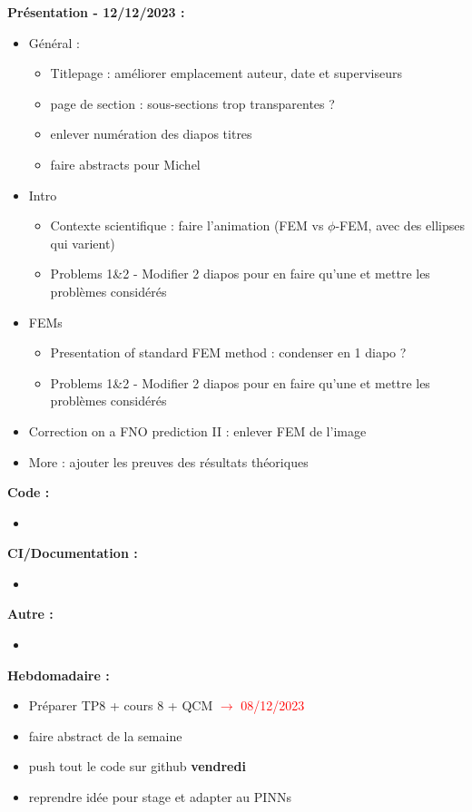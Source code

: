 \textbf{Présentation - 12/12/2023 :}
\begin{itemize}[label=$\square$] 
	\item Général :
	\begin{itemize}[label=\LARGE $\circ$]
		\item Titlepage : améliorer emplacement auteur, date et superviseurs
		\item page de section : sous-sections trop transparentes ?
		\item enlever numération des diapos titres
		\item faire abstracts pour Michel 
	\end{itemize}
	\item Intro
	\begin{itemize}[label=\LARGE $\circ$]
		\item Contexte scientifique : faire l'animation (FEM vs $\phi$-FEM, avec des ellipses qui varient)
		\item Problems 1\&2 - Modifier 2 diapos pour en faire qu'une et mettre les problèmes considérés
	\end{itemize}
	\item FEMs
	\begin{itemize}[label=\LARGE $\circ$]
		\item Presentation of standard FEM method : condenser en 1 diapo ?
		\item Problems 1\&2 - Modifier 2 diapos pour en faire qu'une et mettre les problèmes considérés
	\end{itemize}
	
	\item Correction on a FNO prediction II : enlever FEM de l'image
	\item More : ajouter les preuves des résultats théoriques
\end{itemize}
\textbf{Code :}
\begin{itemize}[label=$\square$] 
	\item
\end{itemize}
\textbf{CI/Documentation :}
\begin{itemize}[label=$\square$] 
	\item 
\end{itemize}
\textbf{Autre :}
\begin{itemize}[label=$\square$] 
	\item
\end{itemize}
\textbf{Hebdomadaire :}
\begin{itemize}[label=$\square$] 
	\item[\done] Préparer TP8 + cours 8 + QCM \textcolor{red}{$\rightarrow$ 08/12/2023}
	\item faire abstract de la semaine 
	\item push tout le code sur github \textbf{vendredi}
	\item reprendre idée pour stage et adapter au PINNs
\end{itemize}